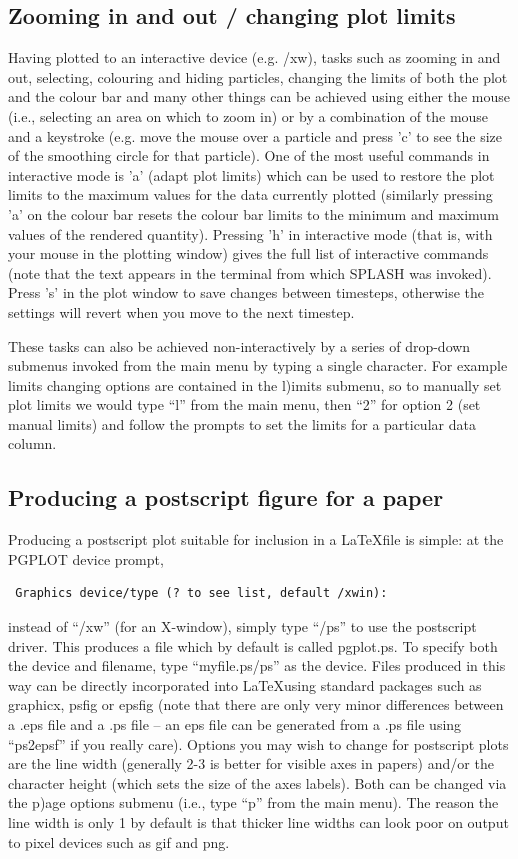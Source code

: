 \documentclass[a4paper,10pt]{article}
\newcommand{\splash}{\textsc{SPLASH }}
\begin{document}
\subsection{Zooming in and out / changing plot limits}
 Having plotted to an interactive device (e.g. /xw), tasks such as zooming in and out, selecting, colouring and hiding particles, changing the limits of both the plot and the colour bar and many other things can be achieved using either the mouse (i.e., selecting an area on which to zoom in) or by a combination of the mouse and a keystroke (e.g. move the mouse over a particle and press 'c' to see the size of the smoothing circle for that particle). One of the most useful commands in interactive mode is 'a' (adapt plot limits) which can be used to restore the plot limits to the maximum values for the data currently plotted (similarly pressing 'a' on the colour bar resets the colour bar limits to the minimum and maximum values of the rendered quantity). Pressing 'h' in interactive mode (that is, with your mouse in the plotting window) gives the full list of interactive commands (note that the text appears in the terminal from which \splash was invoked). Press 's' in the plot window to save changes between timesteps, otherwise the settings will revert when you move to the next timestep. 
 
 These tasks can also be achieved non-interactively by a series of drop-down submenus invoked from the main menu by typing a single character. For example limits changing options are contained in the l)imits submenu, so to manually set plot limits we would type ``l'' from the main menu, then ``2'' for option 2 (set manual limits) and follow the prompts to set the limits for a particular data column. 

\subsection{Producing a postscript figure for a paper}
\label{sec:postscript}
 Producing a postscript plot suitable for inclusion in a \LaTeX  file is simple: at the PGPLOT device prompt, 
\begin{verbatim}
 Graphics device/type (? to see list, default /xwin):
\end{verbatim}
instead of ``/xw'' (for an X-window), simply type ``/ps'' to use the postscript driver. This produces a file which by default is called pgplot.ps. To specify both the device and filename, type ``myfile.ps/ps'' as the device. Files produced in this way can be directly incorporated into \LaTeX  using standard packages such as graphicx, psfig or epsfig (note that there are only very minor differences between a .eps file and a .ps file -- an eps file can be generated from a .ps file using ``ps2epsf'' if you really care). Options you may wish to change for postscript plots are the line width (generally 2-3 is better for visible axes in papers) and/or the character height (which sets the size of the axes labels). Both can be changed via the p)age options submenu (i.e., type ``p'' from the main menu). The reason the line width is only 1 by default is that thicker line widths can look poor on output to pixel devices such as gif and png.
\end{document}
